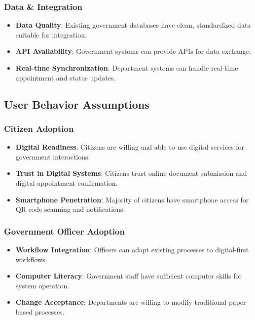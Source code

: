 \documentclass[12pt,a4paper]{article}
\begin{document}
\subsubsection{Data \& Integration}
\begin{itemize}[leftmargin=*]
    \item \textbf{Data Quality}: Existing government databases have clean, standardized data suitable for integration.
    \item \textbf{API Availability}: Government systems can provide APIs for data exchange.
    \item \textbf{Real-time Synchronization}: Department systems can handle real-time appointment and status updates.
\end{itemize}

\subsection{User Behavior Assumptions}

\subsubsection{Citizen Adoption}
\begin{itemize}[leftmargin=*]
    \item \textbf{Digital Readiness}: Citizens are willing and able to use digital services for government interactions.
    \item \textbf{Trust in Digital Systems}: Citizens trust online document submission and digital appointment confirmation.
    \item \textbf{Smartphone Penetration}: Majority of citizens have smartphone access for QR code scanning and notifications.
\end{itemize}

\subsubsection{Government Officer Adoption}
\begin{itemize}[leftmargin=*]
    \item \textbf{Workflow Integration}: Officers can adapt existing processes to digital-first workflows.
    \item \textbf{Computer Literacy}: Government staff have sufficient computer skills for system operation.
    \item \textbf{Change Acceptance}: Departments are willing to modify traditional paper-based processes.
\end{itemize}
\end{document}
